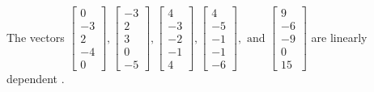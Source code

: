 \begin{exercise}
\begin{exerciseStatement}
  \end{exerciseStatement}
  \begin{exerciseAnswer}
   The vectors \(\left[\begin{array}{r}
0 \\
-3 \\
2 \\
-4 \\
0
\end{array}\right] , \left[\begin{array}{r}
-3 \\
2 \\
3 \\
0 \\
-5
\end{array}\right] , \left[\begin{array}{r}
4 \\
-3 \\
-2 \\
-1 \\
4
\end{array}\right] , \left[\begin{array}{r}
4 \\
-5 \\
-1 \\
-1 \\
-6
\end{array}\right] , \text{ and } \left[\begin{array}{r}
9 \\
-6 \\
-9 \\
0 \\
15
\end{array}\right]\) are 
  	 linearly dependent  .
  


  \end{exerciseAnswer}
\end{exercise}